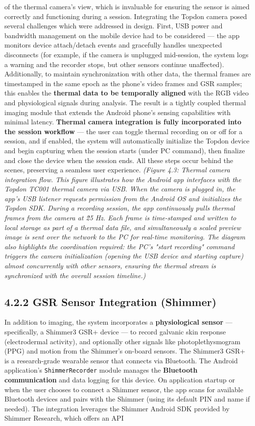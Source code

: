 of the thermal camera's view, which is invaluable for ensuring the sensor is aimed correctly and functioning during a session. Integrating the Topdon camera posed several challenges which were addressed in design. First, USB power and bandwidth management on the mobile device had to be considered --- the app monitors device attach/detach events and gracefully handles unexpected disconnects (for example, if the camera is unplugged mid-session, the system logs a warning and the recorder stops, but other sensors continue unaffected). Additionally, to maintain synchronization with other data, the thermal frames are timestamped in the same epoch as the phone's video frames and GSR samples; this enables the \textbf{thermal data to be temporally aligned} with the RGB video and physiological signals during analysis. The result is a tightly coupled thermal imaging module that extends the Android phone's sensing capabilities with minimal latency. \textbf{Thermal camera integration is fully incorporated into the session workflow} --- the user can toggle thermal recording on or off for a session, and if enabled, the system will automatically initialize the Topdon device and begin capturing when the session starts (under PC command), then finalize and close the device when the session ends. All these steps occur behind the scenes, preserving a seamless user experience. \textit{(Figure 4.3: Thermal camera integration flow. This figure illustrates how the Android app interfaces with the Topdon TC001 thermal camera via USB. When the camera is plugged in, the app's USB listener requests permission from the Android OS and initializes the Topdon SDK. During a recording session, the app continuously pulls thermal frames from the camera at \~25 Hz. Each frame is time-stamped and written to local storage as part of a thermal data file, and simultaneously a scaled preview image is sent over the network to the PC for real-time monitoring. The diagram also highlights the coordination required: the PC's "start recording" command triggers the camera initialization (opening the USB device and starting capture) almost concurrently with other sensors, ensuring the thermal stream is synchronized with the overall session timeline.)} \subsection{4.2.2 GSR Sensor Integration (Shimmer)} In addition to imaging, the system incorporates a \textbf{physiological sensor} --- specifically, a Shimmer3 GSR+ device --- to record galvanic skin response (electrodermal activity), and optionally other signals like photoplethysmogram (PPG) and motion from the Shimmer's on-board sensors. The Shimmer3 GSR+ is a research-grade wearable sensor that connects via Bluetooth. The Android application's \texttt{ShimmerRecorder} module manages the \textbf{Bluetooth communication} and data logging for this device. On application startup or when the user chooses to connect a Shimmer sensor, the app scans for available Bluetooth devices and pairs with the Shimmer (using its default PIN and name if needed). The integration leverages the Shimmer Android SDK provided by Shimmer Research, which offers an API 